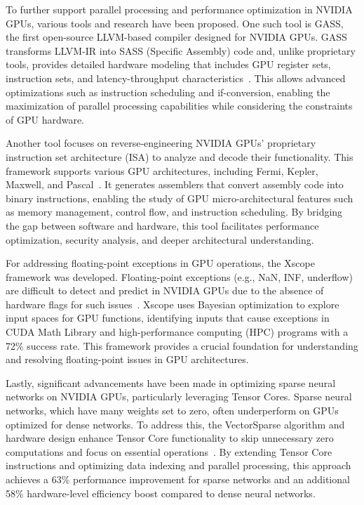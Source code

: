 To further support parallel processing and performance optimization in NVIDIA GPUs, various tools and research have been proposed. One such tool is GASS, the first open-source LLVM-based compiler designed for NVIDIA GPUs. GASS transforms LLVM-IR into SASS (Specific Assembly) code and, unlike proprietary tools, provides detailed hardware modeling that includes GPU register sets, instruction sets, and latency-throughput characteristics~\cite{Yan2022}. This allows advanced optimizations such as instruction scheduling and if-conversion, enabling the maximization of parallel processing capabilities while considering the constraints of GPU hardware.

Another tool focuses on reverse-engineering NVIDIA GPUs' proprietary instruction set architecture (ISA) to analyze and decode their functionality. This framework supports various GPU architectures, including Fermi, Kepler, Maxwell, and Pascal~\cite{Hayes2019}. It generates assemblers that convert assembly code into binary instructions, enabling the study of GPU micro-architectural features such as memory management, control flow, and instruction scheduling. By bridging the gap between software and hardware, this tool facilitates performance optimization, security analysis, and deeper architectural understanding.

For addressing floating-point exceptions in GPU operations, the Xscope framework was developed. Floating-point exceptions (e.g., NaN, INF, underflow) are difficult to detect and predict in NVIDIA GPUs due to the absence of hardware flags for such issues~\cite{Laguna2022}. Xscope uses Bayesian optimization to explore input spaces for GPU functions, identifying inputs that cause exceptions in CUDA Math Library and high-performance computing (HPC) programs with a 72\% success rate. This framework provides a crucial foundation for understanding and resolving floating-point issues in GPU architectures.

Lastly, significant advancements have been made in optimizing sparse neural networks on NVIDIA GPUs, particularly leveraging Tensor Cores. Sparse neural networks, which have many weights set to zero, often underperform on GPUs optimized for dense networks. To address this, the VectorSparse algorithm and hardware design enhance Tensor Core functionality to skip unnecessary zero computations and focus on essential operations~\cite{Zhu2019}. By extending Tensor Core instructions and optimizing data indexing and parallel processing, this approach achieves a 63\% performance improvement for sparse networks and an additional 58\% hardware-level efficiency boost compared to dense neural networks.


